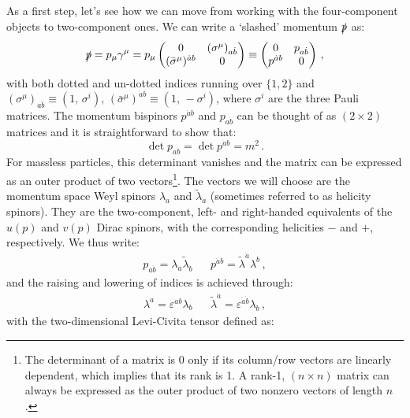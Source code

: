 \documentclass[main.tex]{subfiles}
\begin{document}
As a first step, let's see how we can move from working with the four-component objects to two-component ones. We can write a `slashed' momentum $\slashed{p}$ as:
\begin{equation} \label{eq:pslashed1}
    \slashed{p} = p_\mu \gamma^\mu = p_\mu
    \begin{pmatrix}
    0 & (\sigma^\mu)_{a\dot{b}} \\
    (\bar{\sigma}^\mu)^{\dot{a}b} & 0
    \end{pmatrix}
    \equiv
    \begin{pmatrix}
    0 & p_{a\dot{b}} \\
    p^{\dot{a}b} & 0 
    \end{pmatrix} \, ,
\end{equation}
with both dotted and un-dotted indices running over $\{1,2\}$ and $(\sigma^\mu)_{a\dot{b}} \equiv (1, \, \sigma^i), \, (\bar{\sigma}^\mu)^{\dot{a}b} \equiv (1, \, -\sigma^i)$, where $\sigma^i$ are the three Pauli matrices. The momentum bispinors $p^{\dot{a}b}$ and $p_{a\dot{b}}$ can be thought of as $(2 \times 2)$ matrices and it is straightforward to show that:
\begin{equation}
    \det p_{a\dot{b}} = \det p^{\dot{a}b} = m^2\,.
\end{equation}
For massless particles, this determinant vanishes and the matrix can be expressed as an outer product of two vectors\footnote{The determinant of a matrix is 0 only if its column/row vectors are linearly dependent, which implies that its rank is 1. A rank-1, $(n \times n)$ matrix can always be expressed as the outer product of two nonzero vectors of length $n$.}. The vectors we will choose are the momentum space Weyl spinors $\lambda_a$  and $\tilde{\lambda}_{\dot{a}}$ (sometimes referred to as helicity spinors). They are the two-component, left- and right-handed equivalents of the $u(p)$ and $v(p)$ Dirac spinors, with the corresponding helicities $-$ and $+$, respectively. We thus write:
\begin{align} \label{eq:outerproduct}
    p_{a\dot{b}} = \lambda_a \tilde{\lambda}_{\dot{b}} && p^{\dot{a}b} = \tilde{\lambda}^{\dot{a}} \lambda^b\,,
\end{align}
and the raising and lowering of indices is achieved through:
\begin{align}
    \lambda^a = \varepsilon^{ab} \lambda_b && \tilde{\lambda}^{\dot{a}} = \varepsilon^{\dot{a}\dot{b}} \lambda_{\dot{b}} \,,
\end{align}
with the two-dimensional Levi-Civita tensor defined as:
\end{document}
